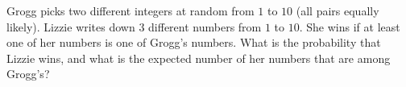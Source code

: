 Grogg picks two different integers at random from $1$ to $10$ (all pairs equally likely). Lizzie writes down $3$ different numbers from $1$ to $10$. She wins if at least one of her numbers is one of Grogg's numbers. What is the probability that Lizzie wins, and what is the expected number of her numbers that are among Grogg's?
